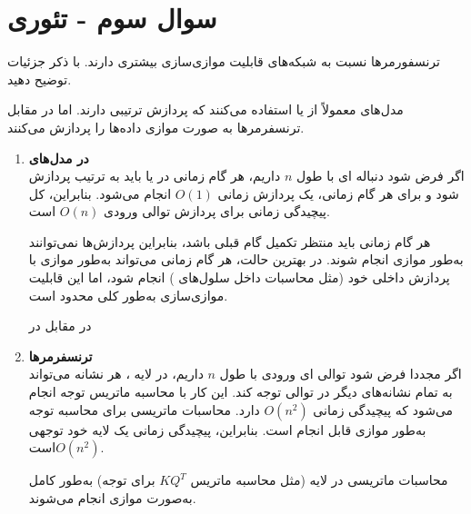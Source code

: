 \section{سوال سوم - تئوری}

ترنسفورمرها نسبت به شبکه‌های  قابلیت موازی‌سازی بیشتری دارند. با ذکر جزئیات توضیح دهید.


\begin{qsolve}
مدل‌های  معمولاً از  یا  استفاده می‌کنند که پردازش ترتیبی دارند. اما در مقابل ترنسفرمرها به صورت موازی داده‌ها را پردازش می‌کنند.

\begin{enumerate}
	\item \textbf{در مدل‌های }\\
	اگر فرض شود دنباله ای با طول $n$ داریم، هر گام زمانی در  یا  باید به ترتیب پردازش شود و برای هر گام زمانی، یک پردازش زمانی $O(1)$ انجام می‌شود. بنابراین، کل پیچیدگی زمانی برای پردازش توالی ورودی $O(n)$ است. 
	
هر گام زمانی باید منتظر تکمیل گام قبلی باشد، بنابراین پردازش‌ها نمی‌توانند به‌طور موازی انجام شوند. در بهترین حالت، هر گام زمانی می‌تواند به‌طور موازی با پردازش داخلی خود (مثل محاسبات داخل سلول‌های ) انجام شود، اما این قابلیت موازی‌سازی به‌طور کلی محدود است.

در مقابل در \item \textbf{ترنسفرمرها}\\
اگر مجددا فرض شود توالی ای ورودی با طول $n$ داریم، در لایه ، هر نشانه می‌تواند به تمام نشانه‌های دیگر در توالی توجه کند. این کار با محاسبه ماتریس توجه انجام می‌شود که پیچیدگی زمانی $O(n^2)$ دارد.
محاسبات ماتریسی برای محاسبه توجه به‌طور موازی قابل انجام است. بنابراین، پیچیدگی زمانی یک لایه خود توجهی $O(n^2)$است.

محاسبات ماتریسی در لایه  (مثل محاسبه ماتریس $KQ^T$ برای توجه) به‌طور کامل به‌صورت موازی انجام می‌شوند.
\end{enumerate}
	
\end{qsolve}

































